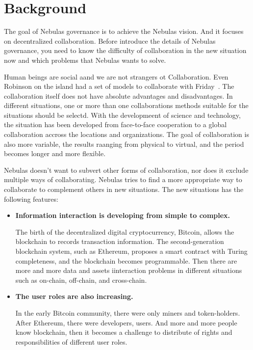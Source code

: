 \section{Background}

The goal of Nebulas governance is to achieve the Nebulas vision. And it focuses on decentralized collaboration. Before introduce the details of Nebulas governance, you need to know the difficulty of collaboration in the new situation now and which problems that Nebulas wants to solve.

\label{background}

Human beings are social aand we are not strangers ot Collaboration. Even Robinson on the island had a set of models to collaborate with Friday~\cite{robinson}. The collaboration itself does not have absolute advantages and disadvantages. In different situations, one or more than one collaborations methods suitable for the situations should be selectd. With the developmeent of science and technology, the situation has been developed from face-to-face cooperation to a global collaboration accross the locations and organizations. The goal of collaboration is also more variable, the results raanging from physical to virtual, and the period becomes longer and more flexible.

Nebulas doesn't want to subvert other forms of collaboration, nor does it exclude multiple ways of collaborating. Nebulas tries to find a more appropriate way to collaborate to complement others in new situations. The new situations has the following features:

\begin{itemize}
	\item \textbf{Information interaction is developing from simple to complex.}

	The birth of the decentralized digital cryptocurrency, Bitcoin, allows the blockchain to records transaction information. The second-generation blockchain system, such as Ethereum, proposes a smart contract with Turing completeness, and the blockchain becomes programmable. Then there are more and more data and assets iinteraction problems in different situations such as on-chain, off-chain, and cross-chain.

	\item \textbf{The user roles are also increasing.}

	In the early Bitcoin community, there were only miners and token-holders. After Ethereum, there were developers, users. And more and more people know blockchain, then it becomes a challenge to distribute of rights and responsibilities of different user roles.

\end{itemize}

